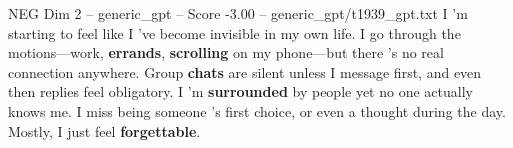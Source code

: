 \begin{textsample}{NEG Dim 2 – generic\_gpt – Score -3.00 – generic\_gpt/t1939\_gpt.txt}  \label{ex:f2_neg_003}
I ’m starting to feel like I ’ve become invisible in my own life.
I go through the motions—work, \textbf{errands}, \textbf{scrolling} on my phone—but there ’s no real connection anywhere.
Group \textbf{chats} are silent unless I message first, and even then replies feel obligatory.
I ’m \textbf{surrounded} by people yet no one actually knows me.
I miss being someone ’s first choice, or even a thought during the day.
Mostly, I just feel \textbf{forgettable}.

\end{textsample}
